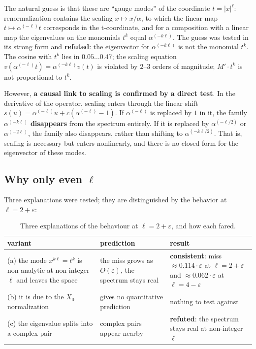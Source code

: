 The natural guess is that these are ``gauge modes'' of the coordinate
$t = |x|^{\ell}$: renormalization contains the scaling $x \mapsto x/\alpha$, to which
the linear map $t \mapsto \alpha^{(-\ell)}t$ corresponds in the t-coordinate, and for a
composition with a linear map the eigenvalues on the monomials $t^{k}$
equal $\alpha^{(-k\ell)}$. The guess was tested in its strong form and
\textbf{refuted}: the eigenvector for $\alpha^{(-k\ell)}$ is not the monomial $t^{k}$.
The cosine with $t^{k}$ lies in $0.05 \dots 0.47$; the scaling equation
$v(\alpha^{(-\ell)}t) = \alpha^{(-k\ell)}v(t)$ is violated by $2$--$3$ orders of magnitude;
$M'\cdot t^{k}$ is not proportional to $t^{k}$.

However, \textbf{a causal link to scaling is confirmed by a direct test}.
In the derivative of the operator, scaling enters through the linear
shift $s(u) = \alpha^{(-\ell)}u + c(\alpha^{(-\ell)} - 1)$. If $\alpha^{(-\ell)}$ is replaced by $1$
in it, the family $\alpha^{(-k\ell)}$ \textbf{disappears} from the spectrum entirely.
If it is replaced by $\alpha^{(-\ell/2)}$ or $\alpha^{(-2\ell)}$, the family also
disappears, rather than shifting to $\alpha^{(-k\ell/2)}$. That is, scaling is
necessary but enters nonlinearly, and there is no closed form for the
eigenvector of these modes.


\subsection{Why only even $\ell$}
\label{sec:8.4}

Three explanations were tested; they are distinguished by the
behavior at $\ell = 2 + \varepsilon$:

\begin{table}[ht]
\centering
\caption{Three explanations of the behaviour at $\ell = 2+\varepsilon$, and how each fared.}
\label{tab:variants}
\begin{tabular}{p{} p{} p{}}
\toprule
variant & prediction & result \\
\midrule
(a) the mode $x^{k\ell} = t^{k}$ is non-analytic at non-integer $\ell$ and leaves the space & the miss grows as $O(\varepsilon)$, the spectrum stays real & \textbf{consistent}: miss $\approx 0.114\cdot\varepsilon$ at $\ell=2+\varepsilon$ and $\approx 0.062\cdot\varepsilon$ at $\ell=4-\varepsilon$ \\
(b) it is due to the $X_{0}$ normalization & gives no quantitative prediction & nothing to test against \\
(c) the eigenvalue splits into a complex pair & complex pairs appear nearby & \textbf{refuted}: the spectrum stays real at non-integer $\ell$ \\
\bottomrule
\end{tabular}
\end{table}
\FloatBarrier


